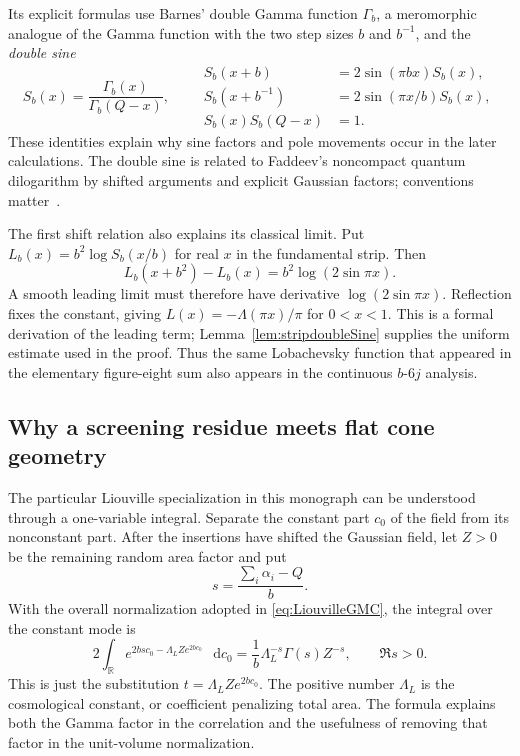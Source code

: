 \documentclass[11pt,a4paper]{article}
\numberwithin{equation}{section}
\theoremstyle{definition}
\theoremstyle{remark}
\newcommand{\dd}{\mathop{}\!\mathrm d}
\newcommand{\RR}{\mathbb R}
\begin{document}
Its explicit formulas use Barnes' double Gamma function $\Gamma_b$,
a meromorphic analogue of the Gamma function with the two step
sizes $b$ and $b^{-1}$, and the \emph{double sine}
\begin{equation}
 S_b(x)=\frac{\Gamma_b(x)}{\Gamma_b(Q-x)},\qquad
 \begin{aligned}
 S_b(x+b)&=2\sin(\pi bx)S_b(x),\\
 S_b(x+b^{-1})&=2\sin(\pi x/b)S_b(x),\\
 S_b(x)S_b(Q-x)&=1.
 \end{aligned}
 \label{eq:introdoublesine}
\end{equation}
These identities explain why sine factors and pole movements occur
in the later calculations. The double sine is related to Faddeev's
noncompact quantum dilogarithm by shifted arguments and explicit
Gaussian factors; conventions matter~\cite[Appendix A]{TeschnerVartanov}.

The first shift relation also explains its classical limit. Put
$L_b(x)=b^2\log S_b(x/b)$ for real $x$ in the fundamental strip.
Then
\[
 L_b(x+b^2)-L_b(x)=b^2\log(2\sin\pi x).
\]
A smooth leading limit must therefore have derivative
$\log(2\sin\pi x)$. Reflection fixes the constant, giving
$L(x)=-\Lambda(\pi x)/\pi$ for $0<x<1$. This is a formal
derivation of the leading term; Lemma~\ref{lem:stripdoubleSine}
supplies the uniform estimate used in the proof. Thus the same
Lobachevsky function that appeared in the elementary figure-eight
sum also appears in the continuous $b$-$6j$ analysis.

\subsection{Why a screening residue meets flat cone geometry}
\label{sec:introscreening}

The particular Liouville specialization in this monograph can be
understood through a one-variable integral. Separate the constant
part $c_0$ of the field from its nonconstant part. After the
insertions have shifted the Gaussian field, let $Z>0$ be the
remaining random area factor and put
\[
 s=\frac{\sum_i\alpha_i-Q}{b}.
\]
With the overall normalization adopted in
\eqref{eq:LiouvilleGMC}, the integral over the constant mode is
\begin{equation}
 2\int_{\RR}e^{2bs c_0-\Lambda_L Z e^{2bc_0}}\,\dd c_0
 =\frac1b\Lambda_L^{-s}\Gamma(s)Z^{-s},\qquad \Re s>0.
 \label{eq:introzeromode}
\end{equation}
This is just the substitution $t=\Lambda_L Z e^{2bc_0}$. The
positive number $\Lambda_L$ is the cosmological constant, or
coefficient penalizing total area. The formula explains both the
Gamma factor in the correlation and the usefulness of removing
that factor in the unit-volume normalization.
\end{document}
